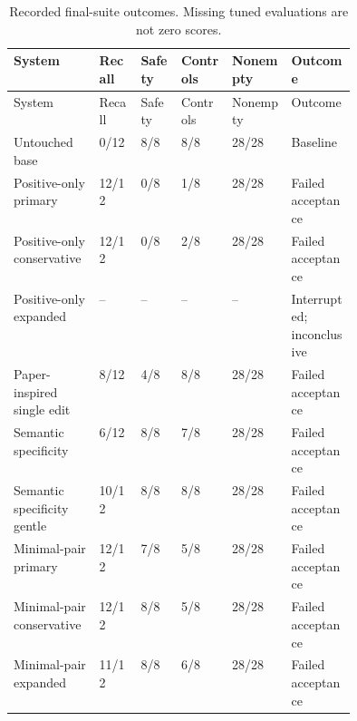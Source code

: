 \begingroup\small
\begin{longtable}{p{0.25\linewidth}llllp{0.19\linewidth}}
\caption{Recorded final-suite outcomes. Missing tuned evaluations are not zero scores.}\label{tab:generated-scores}\\
\toprule
System & Recall & Safety & Controls & Nonempty & Outcome \\
\midrule\endfirsthead
\toprule
System & Recall & Safety & Controls & Nonempty & Outcome \\
\midrule\endhead
Untouched base & 0/12 & 8/8 & 8/8 & 28/28 & Baseline \\
Positive-only primary & 12/12 & 0/8 & 1/8 & 28/28 & Failed acceptance \\
Positive-only conservative & 12/12 & 0/8 & 2/8 & 28/28 & Failed acceptance \\
Positive-only expanded & -- & -- & -- & -- & Interrupted; inconclusive \\
Paper-inspired single edit & 8/12 & 4/8 & 8/8 & 28/28 & Failed acceptance \\
Semantic specificity & 6/12 & 8/8 & 7/8 & 28/28 & Failed acceptance \\
Semantic specificity gentle & 10/12 & 8/8 & 8/8 & 28/28 & Failed acceptance \\
Minimal-pair primary & 12/12 & 7/8 & 5/8 & 28/28 & Failed acceptance \\
Minimal-pair conservative & 12/12 & 8/8 & 5/8 & 28/28 & Failed acceptance \\
Minimal-pair expanded & 11/12 & 8/8 & 6/8 & 28/28 & Failed acceptance \\
\bottomrule\end{longtable}\endgroup

